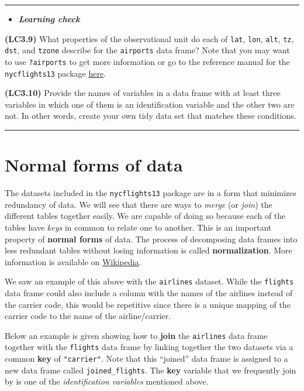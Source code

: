 \documentclass[]{tufte-book}
\let\oldrule=\rule
\renewcommand{\rule}[1]{\oldrule{\linewidth}}
\newenvironment{rmdblock}[1]
  {\begin{shaded*}
  \begin{itemize}
  \renewcommand{\labelitemi}{
    \raisebox{-.7\height}[0pt][0pt]{
    }
  }
  \item
  }
  {
  \end{itemize}
  \end{shaded*}
  }
\newenvironment{learncheck}
  {\begin{rmdblock}{warning}}
  {\end{rmdblock}}
\theoremstyle{definition}
\theoremstyle{definition}
\theoremstyle{remark}
\begin{document}
\begin{center}\rule{0.5\linewidth}{\linethickness}\end{center}

\begin{learncheck}
\textbf{\emph{Learning check}}
\end{learncheck}

\textbf{(LC3.9)} What properties of the observational unit do each of
\texttt{lat}, \texttt{lon}, \texttt{alt}, \texttt{tz}, \texttt{dst}, and
\texttt{tzone} describe for the \texttt{airports} data frame? Note that
you may want to use \texttt{?airports} to get more information or go to
the reference manual for the \texttt{nycflights13} package
\href{https://cran.r-project.org/web/packages/nycflights13/nycflights13.pdf}{here}.

\textbf{(LC3.10)} Provide the names of variables in a data frame with at
least three variables in which one of them is an identification variable
and the other two are not. In other words, create your own tidy data set
that matches these conditions.

\begin{center}\rule{0.5\linewidth}{\linethickness}\end{center}

\section{Normal forms of data}\label{normal-forms-of-data}

The datasets included in the \texttt{nycflights13} package are in a form
that minimizes redundancy of data. We will see that there are ways to
\emph{merge} (or \emph{join}) the different tables together easily. We
are capable of doing so because each of the tables have \emph{keys} in
common to relate one to another. This is an important property of
\textbf{normal forms} of data. The process of decomposing data frames
into less redundant tables without losing information is called
\textbf{normalization}. More information is available on
\href{https://en.wikipedia.org/wiki/Database_normalization}{Wikipedia}.

We saw an example of this above with the \texttt{airlines} dataset.
While the \texttt{flights} data frame could also include a column with
the names of the airlines instead of the carrier code, this would be
repetitive since there is a unique mapping of the carrier code to the
name of the airline/carrier.

Below an example is given showing how to \textbf{join} the
\texttt{airlines} data frame together with the \texttt{flights} data
frame by linking together the two datasets via a common \textbf{key} of
\texttt{"carrier"}. Note that this ``joined'' data frame is assigned to
a new data frame called \texttt{joined\_flights}. The \textbf{key}
variable that we frequently join by is one of the \emph{identification
variables} mentioned above.
\end{document}
